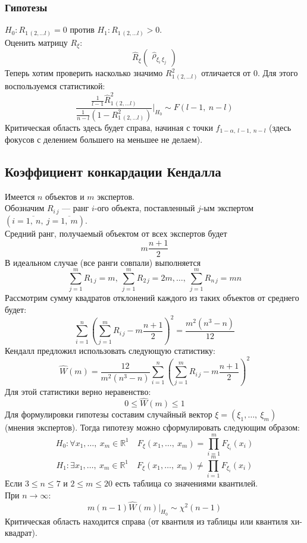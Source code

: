 \documentclass[12pt, a4paper]{article}
\newcommand{\real}{\mathbb{R}}
\begin{document}
\subsubsection*{Гипотезы}
$H_0: R_{1\, (2,\dots l)} = 0$ против $H_1: R_{1\, (2,\dots l)} > 0$.\\
Оценить матрицу $R_{\xi}$:
\[
    \hat R_{\xi} \begin{pmatrix}
        \hat \rho_{\xi_i\, \xi_j}
    \end{pmatrix}
\]
Теперь хотим проверить насколько значимо $R^2_{1\, (2,\dots l)}$ отличается от 0. Для этого воспользуемся статистикой:
\[
    \frac{ \frac{1}{l - 1} \hat R_{1\, (2,\dots l)}^2 }{ \frac{1}{n - l} \left( 1 - R_{1\, (2,\dots l)}^2 \right)} \Bigg|_{H_0} \sim F(l - 1,\ n - l)
\]
Критическая область здесь будет справа, начиная с точки $f_{1 - \alpha,\ l - 1,\ n - l}$ (здесь фокусов с делением большего на меньшее не делаем).
\subsection*{Коэффициент конкардации Кендалла}
Имеется $n$ объектов и $m$ экспертов.\\
Обозначим $R_{i\, j}$ --- ранг $i$-ого объекта, поставленный $j$-ым экспертом $\left( i = \overline{1,\ n},\ j = \overline{1,\ m} \right)$.\\
Средний ранг, получаемый объектом от всех экспертов будет
\[
m \frac{n + 1}{2}
\]
В идеальном случае (все ранги совпали) выполняется
\[
\sum_{j = 1}^{m} R_{1\, j} = m,\ \sum_{j = 1}^{m} R_{2\, j} = 2m,\dots,\ \sum_{j = 1}^{m} R_{n\, j} = mn
\]
Рассмотрим сумму квадратов отклонений каждого из таких объектов от среднего будет:
\[
\sum_{i = 1}^{n} {\left( \sum_{j = 1}^{m} R_{i\, j} - m \frac{n + 1}{2} \right)}^2 = \frac{m^2 (n^3 - n)}{12}
\]
Кендалл предложил использовать следующую статистику:
\[
\hat W(m) = \frac{12}{m^2 (n^3 - n)} \sum_{i = 1}^{n} {\left( \sum_{j = 1}^{m} R_{i\, j} - m \frac{n + 1}{2} \right)}^2
\]
Для этой статистики верно неравенство:
\[
0 \leq \hat W(m) \leq 1
\]
Для формулировки гипотезы составим случайный вектор $\xi = (\xi_1,\dots,\ \xi_m)$ (мнения экспертов). Тогда гипотезу можно сформулировать следующим образом:
\[
H_0: \forall x_1,\dots,\ x_m \in \real^1\quad F_{\xi}(x_1,\dots,\ x_m) = \prod_{i = 1}^{m} F_{\xi_i}(x_i)
\]
\[
H_1: \exists x_1,\dots,\ x_m \in \real^1 \quad F_{\xi}(x_1,\dots,\ x_m) \neq  \prod_{i = 1}^{m} F_{\xi_i}(x_i)
\]
Если $3 \leq n \leq 7$ и $2 \leq m \leq 20$ есть таблица со значениями квантилей.\\
При $n\to \infty$:
\[
m(n - 1)\hat W(m) \Big|_{H_0} \sim \chi^2(n - 1)
\]
Критическая область находится справа (от квантиля из таблицы или квантиля хи-квадрат).
\end{document}
